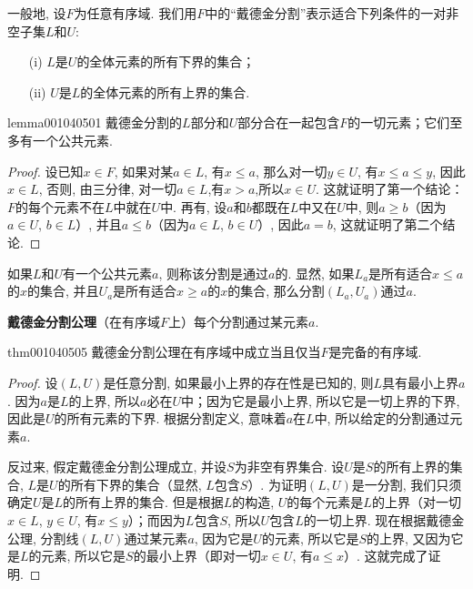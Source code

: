一般地, 设$F$为任意有序域. 我们用$F$中的“戴德金分割”表示适合下列条件的一对非空子集$L$和$U$:
\begin{enumerate}
\item[(i)]$L$是$U$的全体元素的所有下界的集合；
\item[(ii)]$U$是$L$的全体元素的所有上界的集合. 
\end{enumerate}

\begin{lemma}{}{lemma001040501}
戴德金分割的$L$部分和$U$部分合在一起包含$F$的一切元素；它们至多有一个公共元素. 
\end{lemma}

\begin{proof}
设已知$x \in F$, 如果对某$a \in L$, 有$x \le a$, 那么对一切$y \in U$, 有$x \le a \le y$, 因此$x \in L$, 否则, 由三分律, 对一切$a \in L$,有$x > a$,所以$x \in U$. 这就证明了第一个结论：$F$的每个元素不在$L$中就在$U$中. 再有, 设$a$和$b$都既在$L$中又在$U$中, 则$a \ge b$（因为$a \in U$, $b \in L$）, 并且$a \le b$（因为$a \in L$, $b \in U$）, 因此$a=b$, 这就证明了第二个结论. 
\end{proof}

如果$L$和$U$有一个公共元素$a$, 则称该分割是通过$a$的. 显然, 如果$L_a$是所有适合$x \le a$的$x$的集合, 并且$U_a$是所有适合$x\ge a$的$x$的集合, 那么分割$(L_a, U_a)$通过$a$.

\textbf{戴德金分割公理}\quad （在有序域$F$上）每个分割通过某元素$a$.

\begin{theorem}{}{thm001040505}
戴德金分割公理在有序域中成立当且仅当$F$是完备的有序域. 
\end{theorem}

\begin{proof}
设$(L, U)$是任意分割, 如果最小上界的存在性是已知的, 则$L$具有最小上界$a$. 因为$a$是$L$的上界, 所以$a$必在$U$中；因为它是最小上界, 所以它是一切上界的下界, 因此是$U$的所有元素的下界. 根据分割定义, 意味着$a$在$L$中, 所以给定的分割通过元素$a$.

反过来, 假定戴德金分割公理成立, 并设$S$为非空有界集合. 设$U$是$S$的所有上界的集合, $L$是$U$的所有下界的集合（显然, $L$包含$S$）. 为证明$(L,U)$是一分割, 我们只须确定$U$是$L$的所有上界的集合. 但是根据$L$的构造, $U$的每个元素是$L$的上界（对一切$x \in L$, $y \in U$, 有$x \le y$）；而因为$L$包含$S$, 所以$U$包含$L$的一切上界. 现在根据戴德金公理, 分割线$(L,U)$通过某元素$a$, 因为它是$U$的元素, 所以它是$S$的上界, 又因为它是$L$的元素, 所以它是$S$的最小上界（即对一切$x \in U$, 有$a \le x$）. 这就完成了证明. 
\end{proof}

